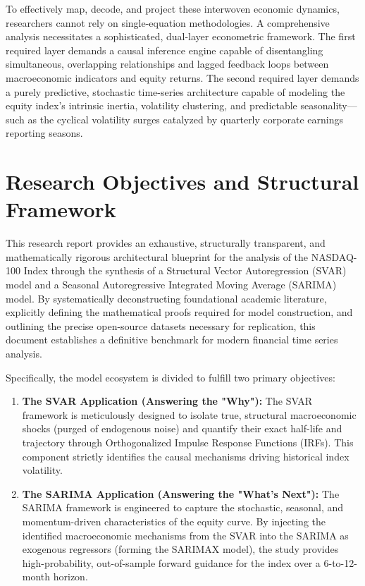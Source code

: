 \documentclass[12pt,a4paper]{report}
\begin{document}
To effectively map, decode, and project these interwoven economic dynamics, researchers cannot rely on single-equation methodologies. A comprehensive analysis necessitates a sophisticated, dual-layer econometric framework. The first required layer demands a causal inference engine capable of disentangling simultaneous, overlapping relationships and lagged feedback loops between macroeconomic indicators and equity returns. The second required layer demands a purely predictive, stochastic time-series architecture capable of modeling the equity index's intrinsic inertia, volatility clustering, and predictable seasonality—such as the cyclical volatility surges catalyzed by quarterly corporate earnings reporting seasons.

\section{Research Objectives and Structural Framework}
This research report provides an exhaustive, structurally transparent, and mathematically rigorous architectural blueprint for the analysis of the NASDAQ-100 Index through the synthesis of a Structural Vector Autoregression (SVAR) model and a Seasonal Autoregressive Integrated Moving Average (SARIMA) model. By systematically deconstructing foundational academic literature, explicitly defining the mathematical proofs required for model construction, and outlining the precise open-source datasets necessary for replication, this document establishes a definitive benchmark for modern financial time series analysis.

Specifically, the model ecosystem is divided to fulfill two primary objectives:
\begin{enumerate}
    \item \textbf{The SVAR Application (Answering the "Why"):} The SVAR framework is meticulously designed to isolate true, structural macroeconomic shocks (purged of endogenous noise) and quantify their exact half-life and trajectory through Orthogonalized Impulse Response Functions (IRFs). This component strictly identifies the causal mechanisms driving historical index volatility.
    \item \textbf{The SARIMA Application (Answering the "What's Next"):} The SARIMA framework is engineered to capture the stochastic, seasonal, and momentum-driven characteristics of the equity curve. By injecting the identified macroeconomic mechanisms from the SVAR into the SARIMA as exogenous regressors (forming the SARIMAX model), the study provides high-probability, out-of-sample forward guidance for the index over a 6-to-12-month horizon.
\end{enumerate}
\end{document}
